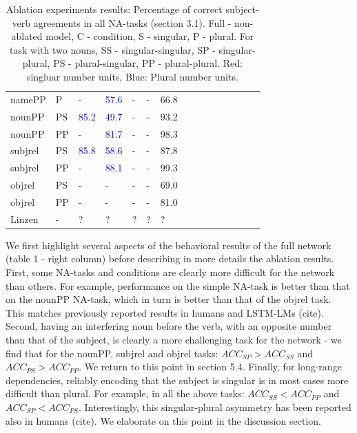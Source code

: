 \begin{center}
\begin{table}[ht]
\begin{tabular}{|P{1.4cm}|P{0.4cm}||P{0.6cm}|P{0.6cm}|P{0.6cm}|P{0.6cm}|P{0.6cm}|P{0.6cm}|P{0.6cm}|P{0.6cm}|P{0.6cm}|P{0.6cm}|P{0.6cm}|P{0.6cm}||P{0.6cm}|}
\B namePP & \B P & - &  \textcolor{blue}{57.6} &  - &  - &  66.8 \\

\B nounPP & \B PS &  \textcolor{blue}{85.2} &  \textcolor{blue}{49.7} & - &  - &  93.2 \\

\B nounPP & \B PP &  - &  \textcolor{blue}{81.7} &  - &  - &  98.3 \\

\B subjrel & \B PS &  \textcolor{blue}{85.8}  &  \textcolor{blue}{58.6}  &  - &  - &  87.8 \\

\B subjrel & \B PP &  - &  \textcolor{blue}{88.1} &  - &  - &  99.3 \\

\B objrel & \B PS & - &  - &  - &  - &  69.0 \\

\B objrel & \B PP &  - &  - &  - &  - &  81.0 \\
\hline
\hline
\B Linzen & \B - &  ? &  ? &  ? &  ? &  ? \\
\hline
\end{tabular}
\caption{Ablation experiments results: Percentage of correct subject-verb agreements in all NA-tasks (section 3.1). Full - non-ablated model, C - condition, S - singular, P - plural. For task with two nouns, SS - singular-singular, SP - singular-plural, PS - plural-singular, PP - plural-plural. Red: singluar number units, Blue: Plural number units.}
\end{table}
\end{center}

We first highlight several aspects of the behavioral results of the full network (table 1 - right column) before describing in more details the ablation results. First, some NA-tasks and conditions are clearly more difficult for the network than others. For example, performance on the simple NA-task is better than that on the nounPP NA-task, which in turn is better than that of the objrel task. This matches previously reported results in humans and LSTM-LMs (cite). Second, having an interfering noun before the verb, with an opposite number than that of the subject, is clearly a more challenging task for the network - we find that for the nounPP, subjrel and objrel tasks: $ACC_{SP}>ACC_{SS}$ and $ACC_{PS}>ACC_{PP}$. We return to this point in section 5.4. Finally, for long-range dependencies, reliably encoding that the subject is singular is in most cases more difficult than plural. For example, in all the above tasks: $ACC_{SS}<ACC_{PP}$ and $ACC_{SP}<ACC_{PS}$. Interestingly, this singular-plural asymmetry has been reported also in humans (cite). We elaborate on this point in the discussion section.

